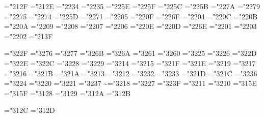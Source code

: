 \mathchardef\triangleleft="212F
\mathchardef\triangleright="212E
\mathchardef\bigtriangleup="2234
\mathchardef\bigtriangledown="2235
\mathchardef\wedge="225E \let\land=\wedge
\mathchardef\vee="225F \let\lor=\vee
\mathchardef\cap="225C
\mathchardef\cup="225B
\mathchardef\ddagger="227A
\mathchardef\dagger="2279
\mathchardef\sqcap="2275
\mathchardef\sqcup="2274
\mathchardef\uplus="225D
\mathchardef\amalg="2271
\mathchardef\diamond="2205
\mathchardef\bullet="220F
\mathchardef\wr="226F
\mathchardef\div="2204
\mathchardef\odot="220C
\mathchardef\oslash="220B
\mathchardef\otimes="220A
\mathchardef\ominus="2209
\mathchardef\oplus="2208
\mathchardef\mp="2207
\mathchardef\pm="2206
\mathchardef\circ="220E
\mathchardef\bigcirc="220D
\mathchardef\setminus="226E %
\mathchardef\cdot="2201
\mathchardef\ast="2203
\mathchardef\times="2202
\mathchardef\star="213F

\mathchardef\propto="322F
\mathchardef\sqsubseteq="3276
\mathchardef\sqsupseteq="3277
\mathchardef\parallel="326B
\mathchardef\mid="326A
\mathchardef\dashv="3261
\mathchardef\vdash="3260
\mathchardef\nearrow="3225
\mathchardef\searrow="3226
\mathchardef\nwarrow="322D
\mathchardef\swarrow="322E
\mathchardef\Leftrightarrow="322C
\mathchardef\Leftarrow="3228
\mathchardef\Rightarrow="3229
\def\neq{\not=} \let\ne=\neq
\mathchardef\leq="3214 \let\le=\leq
\mathchardef\geq="3215 \let\ge=\geq
\mathchardef\succ="321F
\mathchardef\prec="321E
\mathchardef\approx="3219
\mathchardef\succeq="3217
\mathchardef\preceq="3216
\mathchardef\supset="321B
\mathchardef\subset="321A
\mathchardef\supseteq="3213
\mathchardef\subseteq="3212
\mathchardef\in="3232
\mathchardef\ni="3233 \let\owns=\ni
\mathchardef\gg="321D
\mathchardef\ll="321C
\mathchardef\not="3236
\mathchardef\leftrightarrow="3224
\mathchardef\leftarrow="3220 \let\gets=\leftarrow
\mathchardef\rightarrow="3221 \let\to=\rightarrow
\mathchardef\mapstochar="3237 \def\mapsto{\mapstochar\rightarrow}
\mathchardef\sim="3218
\mathchardef\simeq="3227
\mathchardef\perp="323F
\mathchardef\equiv="3211
\mathchardef\asymp="3210
\mathchardef\smile="315E
\mathchardef\frown="315F
\mathchardef\leftharpoonup="3128
\mathchardef\leftharpoondown="3129
\mathchardef\rightharpoonup="312A
\mathchardef\rightharpoondown="312B

\def\joinrel{\mathrel{\mkern-3mu}}
\def\relbar{\mathrel{\smash-}} %
\def\Relbar{\mathrel=}
\mathchardef\lhook="312C \def\hookrightarrow{\lhook\joinrel\rightarrow}
\mathchardef\rhook="312D \def\hookleftarrow{\leftarrow\joinrel\rhook}
\def\bowtie{\mathrel\triangleright\joinrel\mathrel\triangleleft}
\def\models{\mathrel|\joinrel=}
\def\Longrightarrow{\Relbar\joinrel\Rightarrow}
\def\longrightarrow{\relbar\joinrel\rightarrow}
\def\longleftarrow{\leftarrow\joinrel\relbar}
\def\Longleftarrow{\Leftarrow\joinrel\Relbar}
\def\longmapsto{\mapstochar\longrightarrow}
\def\longleftrightarrow{\leftarrow\joinrel\rightarrow}
\def\Longleftrightarrow{\Leftarrow\joinrel\Rightarrow}
\def\iff{\;\Longleftrightarrow\;}

